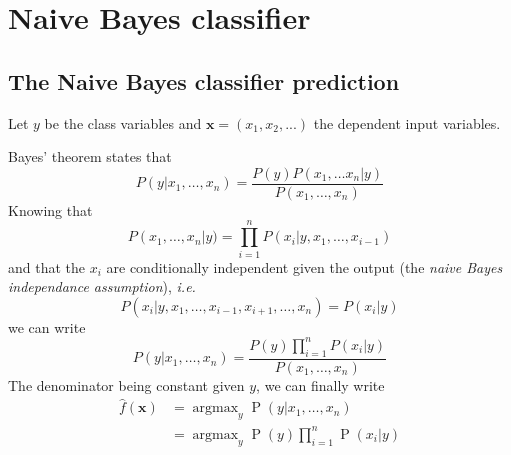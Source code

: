 \section{Naive Bayes classifier}

\subsection{The Naive Bayes classifier prediction}
Let $y$ be the class variables and $\bm{x} = (x_1, x_2, ...)$ the dependent input variables.\par
Bayes' theorem states that
\begin{equation*}
    P\left(y | x_{1}, \ldots, x_{n}\right) = \frac{P(y) P\left(x_{1}, \ldots x_{n} | y\right)}{P\left(x_{1}, \ldots, x_{n}\right)}
\end{equation*}
Knowing that
\begin{equation*}
    P\left(x_{1}, \ldots, x_{n}\right | y) = \prod_{i=1}^{n} P\left(x_{i} | y, x_{1}, \ldots, x_{i-1}\right)
\end{equation*}
and that the $x_i$ are conditionally independent given the output (the {\it naive Bayes independance assumption}), {\it i.e.}
\begin{equation*}
    P\left(x_{i} | y, x_{1}, \ldots, x_{i-1}, x_{i+1}, \ldots, x_{n}\right) = P\left(x_{i} | y\right)
\end{equation*}
we can write
\begin{equation*}
    P\left(y | x_{1}, \ldots, x_{n}\right) = \frac{P(y) \prod_{i=1}^{n} P\left(x_{i} | y\right)}{P\left(x_{1}, \ldots, x_{n}\right)}
\end{equation*}
The denominator being constant given $y$, we can finally write
\begin{align*}
    \hat{f}(\mathbf{x}) &= \operatorname{argmax}_{y} \operatorname{P}\left(y | x_{1}, \ldots, x_{n}\right)\\
    &= \operatorname{argmax}_{y} \operatorname{P}(y) \prod_{i=1}^{n} \operatorname{P}\left(x_{i} | y\right)
\end{align*}

\setcounter{subsection}{2}
